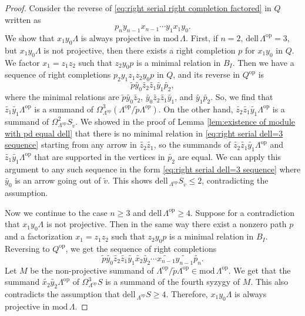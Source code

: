 \documentclass[10pt,a4paper]{amsart}
\newcommand{\dell}{\mathrm{dell}\,}
\newcommand{\op}{\mathrm{op}}
\renewcommand{\mod}{\mathrm{mod}\,}
\begin{document}
\begin{proof}
Consider the reverse of \eqref{eq:right serial right completion factored} in $Q$ written as
\begin{equation}
\label{eq:right serial right completion reversed}
p_n y_{n-1}x_{n-1}\cdots y_1x_1y_0.
\end{equation}
We show that $x_1y_0\Lambda$ is always projective in $\mod\Lambda$. First, if $n=2$, $\dell\Lambda^{\op}=3$, but $x_1y_0\Lambda$ is not projective, then there exists a right completion $p$ for $x_1y_0$ in $Q$. We factor $x_1=z_1z_2$ such that $z_2y_0p$ is a minimal relation in $B_I$. Then we have a sequence of right completions $p_2y_1z_1z_2y_0p$ in $Q$, and its reverse in $Q^{\op}$ is
\begin{equation}
\label{eq:right serial dell=3 sequence}
\widetilde{p}\widetilde{y_0}\widetilde{z_2}\widetilde{z_1}\widetilde{y_1}\widetilde{p_2},
\end{equation}
where the minimal relations are $\widetilde{p}\widetilde{y_0}\widetilde{z_2}$, $\widetilde{y_0}\widetilde{z_2}\widetilde{z_1}\widetilde{y_1}$, and $\widetilde{y_1}\widetilde{p_2}$. So, we find that $\widetilde{z_1}\widetilde{y_1}\Lambda^{\op}$ is a summand of $\Omega^3_{\Lambda^{\op}} (\Lambda^{\op}/\widetilde{p}\Lambda^{op})$. On the other hand, $\widetilde{z_2}\widetilde{z_1}\widetilde{y_1}\Lambda^{\op}$ is a summand of $\Omega^2_{\Lambda^{\op}} S_{\tilde{v}}$. We showed in the proof of Lemma \ref{lem:existence of module with pd equal dell} that there is no minimal relation in \eqref{eq:right serial dell=3 sequence} starting from any arrow in $\widetilde{z_2}\widetilde{z_1}$, so the summands of $\widetilde{z_2}\widetilde{z_1}\widetilde{y_1}\Lambda^{\op}$ and $\widetilde{z_1}\widetilde{y_1}\Lambda^{\op}$ that are supported in the vertices in $\widetilde{p_2}$ are equal. We can apply this argument to any such sequence in the form \eqref{eq:right serial dell=3 sequence} where $\widetilde{y_0}$ is an arrow going out of $\tilde{v}$. This shows $\dell\!_{\Lambda^{\op}} S_{\tilde{v}} \leq 2$, contradicting the assumption.

Now we continue to the case $n\geq 3$ and $\dell\Lambda^{\op}\geq 4$. Suppose for a contradiction that $x_1y_0\Lambda$ is not projective. Then in the same way there exist a nonzero path $p$ and a factorization $x_1=z_1z_2$ such that $z_2y_0p$ is a minimal relation in $B_I$. Reversing to $Q^{\op}$, we get the sequence of right completions
\begin{equation}
\label{eq:right serial right completion factored additional term}
\widetilde{p}\widetilde{y_0}\widetilde{z_2}\widetilde{z_1}\widetilde{y_1}\widetilde{x_2}\widetilde{y_2} \cdots \widetilde{x_{n-1}}\widetilde{y_{n-1}}\widetilde{p_n}.
\end{equation}
Let $M$ be the non-projective summand of $\Lambda^{\op}/\tilde{p}\Lambda^{\op}\in\mod\Lambda^{\op}$. We get that the summand $\widetilde{x_2}\widetilde{y_2}\Lambda^{\op}$ of $\Omega_{\Lambda^{\op}}^3 S$ is a summand of the fourth syzygy of $M$. This also contradicts the assumption that $\dell\!_{\Lambda^{\op}} S\geq 4$. Therefore, $x_1y_0\Lambda$ is always projective in $\mod\Lambda$.


\end{proof}
\end{document}
